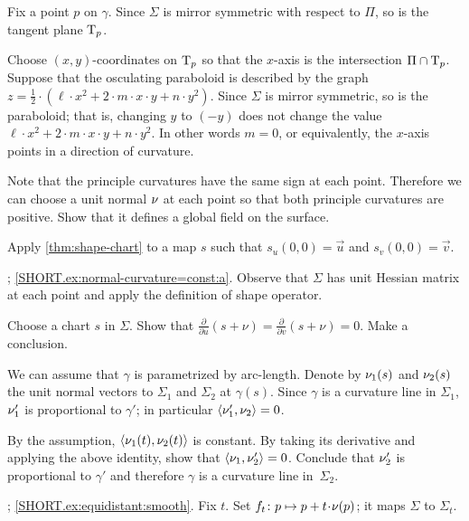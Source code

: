 \setcounter{eqtn}{0}

Fix a point $p$ on $\gamma$.
Since $\Sigma$ is mirror symmetric with respect to $\Pi$,
so is the tangent plane $\mathrm{T}_p$.

Choose $(x,y)$-coordinates on $\mathrm{T}_p$ so that the $x$-axis is the intersection $\Pi\cap  \mathrm{T}_p$.
Suppose that the osculating paraboloid is described by the graph 
$z=\tfrac12\cdot(\ell\cdot x^2+2\cdot m\cdot x\cdot y+n\cdot y^2)$.
Since $\Sigma$ is mirror symmetric, so is the paraboloid;
that is, changing $y$ to $(-y)$ does not change the value 
$\ell\cdot x^2+2\cdot m\cdot x\cdot y+n\cdot y^2$.
In other words $m=0$, or equivalently, the $x$-axis points in a direction of curvature.

 Note that the principle curvatures have the same sign at each point.
Therefore we can choose a unit normal $\nu$ at each point so that both principle curvatures are positive.
Show that it defines a global field on the surface.

Apply \ref{thm:shape-chart} to a map $s$ such that $s_u(0,0)=\vec u$ and $s_v(0,0)=\vec v$.

\parbf{\ref{ex:normal-curvature=const}}; \ref{SHORT.ex:normal-curvature=const:a}.
Observe that $\Sigma$ has unit Hessian matrix at each point and apply the definition of shape operator.

Choose a chart $s$ in $\Sigma$.
Show that
$\tfrac{\partial }{\partial u}(s+\nu)
=
\tfrac{\partial }{\partial v}(s+\nu)
=
0$.
Make a conclusion.

We can assume that $\gamma$ is parametrized by  arc-length.
Denote by $\nu_1(s)$ and $\nu_2(s)$ the unit normal vectors to $\Sigma_1$ and $\Sigma_2$ at $\gamma(s)$.
Since $\gamma$ is a curvature line in $\Sigma_1$,  
$\nu_1'$ is proportional to $\gamma'$;
in particular $\langle\nu_1',\nu_2\rangle=0$.

By the assumption, $\langle \nu_1(t),\nu_2(t)\rangle$ is constant.
By taking its derivative and applying the above identity, show that $\langle\nu_1,\nu_2'\rangle=0$.
Conclude that $\nu_2'$ is proportional to $\gamma'$
and therefore $\gamma$ is a curvature line in~$\Sigma_2$.

\parbf{\ref{ex:equidistant}};
\ref{SHORT.ex:equidistant:smooth}.
Fix $t$.
Set $f_t\:p\mapsto p+t\cdot\Norm(p)$; it maps $\Sigma$ to $\Sigma_t$.


